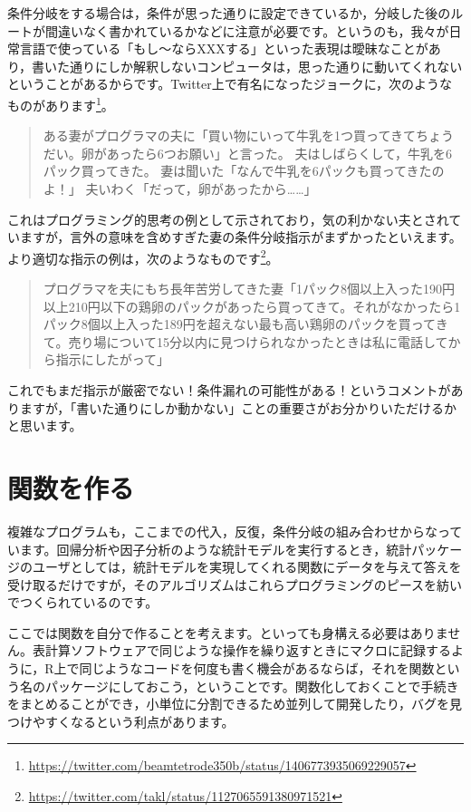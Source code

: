 \documentclass{ltjsbook}
\begin{document}
条件分岐をする場合は，条件が思った通りに設定できているか，分岐した後のルートが間違いなく書かれているかなどに注意が必要です。というのも，我々が日常言語で使っている「もし〜ならXXXする」といった表現は曖昧なことがあり，書いた通りにしか解釈しないコンピュータは，思った通りに動いてくれないということがあるからです。Twitter上で有名になったジョークに，次のようなものがあります\footnote{\url{https://twitter.com/beamtetrode350b/status/1406773935069229057}}。

\begin{quote}
	ある妻がプログラマの夫に「買い物にいって牛乳を1つ買ってきてちょうだい。卵があったら6つお願い」と言った。
	夫はしばらくして，牛乳を6パック買ってきた。
	妻は聞いた「なんで牛乳を6パックも買ってきたのよ！」
	夫いわく「だって，卵があったから……」
\end{quote}

これはプログラミング的思考の例として示されており，気の利かない夫とされていますが，言外の意味を含めすぎた妻の条件分岐指示がまずかったといえます。より適切な指示の例は，次のようなものです\footnote{\url{https://twitter.com/takl/status/1127065591380971521}}。

\begin{quote}
	プログラマを夫にもち長年苦労してきた妻「1パック8個以上入った190円以上210円以下の鶏卵のパックがあったら買ってきて。それがなかったら1パック8個以上入った189円を超えない最も高い鶏卵のパックを買ってきて。売り場について15分以内に見つけられなかったときは私に電話してから指示にしたがって」
\end{quote}

これでもまだ指示が厳密でない！条件漏れの可能性がある！というコメントがありますが，「書いた通りにしか動かない」ことの重要さがお分かりいただけるかと思います。

\section{関数を作る}

複雑なプログラムも，ここまでの代入，反復，条件分岐の組み合わせからなっています。回帰分析や因子分析のような統計モデルを実行するとき，統計パッケージのユーザとしては，統計モデルを実現してくれる関数にデータを与えて答えを受け取るだけですが，そのアルゴリズムはこれらプログラミングのピースを紡いでつくられているのです。

ここでは関数を自分で作ることを考えます。といっても身構える必要はありません。表計算ソフトウェアで同じような操作を繰り返すときにマクロに記録するように，R上で同じようなコードを何度も書く機会があるならば，それを関数という名のパッケージにしておこう，ということです。関数化しておくことで手続きをまとめることができ，小単位に分割できるため並列して開発したり，バグを見つけやすくなるという利点があります。
\end{document}

